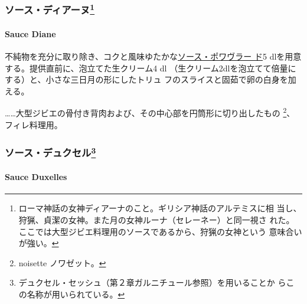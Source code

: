 \maeaki

\hypertarget{ux30bdux30fcux30b9ux30c7ux30a3ux30a2ux30fcux30cc28}{%
\subsubsection[ソース・ディアーヌ]{\texorpdfstring{ソース・ディアーヌ\footnote{ローマ神話の女神ディアーナのこと。ギリシア神話のアルテミスに相
  当し、狩猟、貞潔の女神。また月の女神ルーナ（セレーネー）と同一視さ
  れた。ここでは大型ジビエ料理用のソースであるから、狩猟の女神という
  意味合いが強い。}}{ソース・ディアーヌ}}\label{ux30bdux30fcux30b9ux30c7ux30a3ux30a2ux30fcux30cc28}}

\hypertarget{sauce-diane}{%
\paragraph{Sauce Diane}\label{sauce-diane}}

  

不純物を充分に取り除き、コクと風味ゆたかな\protect\hyperlink{sauce-poivrade}{ソース・ポワヴラー
ド}5 dlを用意する。提供直前に、泡立てた生クリーム4 dl
（生クリーム2dlを泡立てて倍量にする）と、小さな三日月の形にしたトリュ
フのスライスと固茹で卵の白身を加える。

\ldots{}\ldots{}大型ジビエの骨付き背肉および、その中心部を円筒形に切り出したもの
\footnote{noisette ノワゼット。}、フィレ料理用。

\maeaki

\hypertarget{ux30bdux30fcux30b9ux30c7ux30e5ux30afux30bbux30eb29}{%
\subsubsection[ソース・デュクセル]{\texorpdfstring{ソース・デュクセル\footnote{デュクセル・セッシュ（第２章ガルニチュール参照）を用いることか
  らこの名称が用いられている。}}{ソース・デュクセル}}\label{ux30bdux30fcux30b9ux30c7ux30e5ux30afux30bbux30eb29}}

\hypertarget{sauce-duxelles}{%
\paragraph{Sauce Duxelles}\label{sauce-duxelles}}

  

